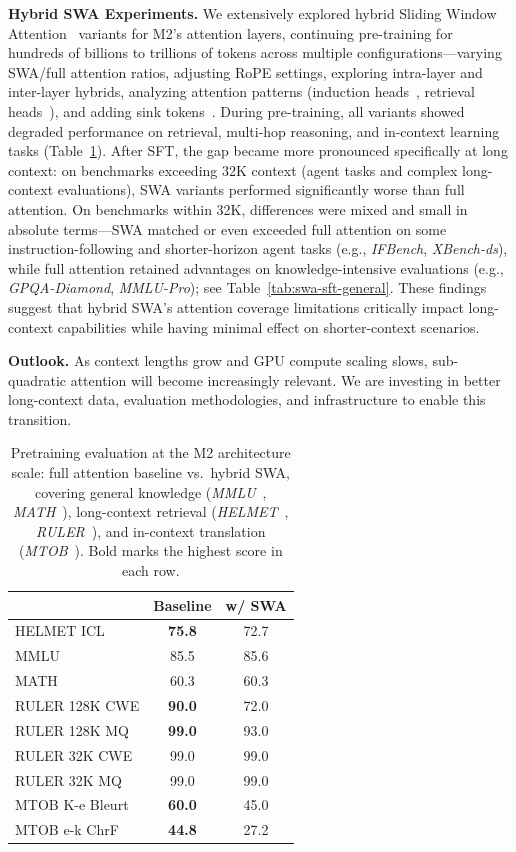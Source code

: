 \noindent \textbf{Hybrid SWA Experiments.} We extensively explored hybrid Sliding Window Attention~\citep{beltagy2020longformer} variants for M2's attention layers, continuing pre-training for hundreds of billions to trillions of tokens across multiple configurations---varying SWA/full attention ratios, adjusting RoPE settings, exploring intra-layer and inter-layer hybrids, analyzing attention patterns (induction heads~\citep{olsson2022induction}, retrieval heads~\citep{wu2024retrieval}), and adding sink tokens~\citep{xiao2024streamingllm}. During pre-training, all variants showed degraded performance on retrieval, multi-hop reasoning, and in-context learning tasks (Table~\ref{tab:swa-pretrain}). After SFT, the gap became more pronounced specifically at long context: on benchmarks exceeding 32K context (agent tasks and complex long-context evaluations), SWA variants performed significantly worse than full attention. On benchmarks within 32K, differences were mixed and small in absolute terms---SWA matched or even exceeded full attention on some instruction-following and shorter-horizon agent tasks (e.g., \emph{IFBench}, \emph{XBench-ds}), while full attention retained advantages on knowledge-intensive evaluations (e.g., \emph{GPQA-Diamond}, \emph{MMLU-Pro}); see Table~\ref{tab:swa-sft-general}. These findings suggest that hybrid SWA's attention coverage limitations critically impact long-context capabilities while having minimal effect on shorter-context scenarios.

\noindent \textbf{Outlook.} As context lengths grow and GPU compute scaling slows, sub-quadratic attention will become increasingly relevant. We are investing in better long-context data, evaluation methodologies, and infrastructure to enable this transition.

\begin{table}[h]
\centering
\caption{Pretraining evaluation at the M2 architecture scale: full attention baseline vs.\ hybrid SWA, covering general knowledge (\emph{MMLU}~\citep{hendrycks2021mmlu}, \emph{MATH}~\citep{hendrycks2021math}), long-context retrieval (\emph{HELMET}~\citep{yen2024helmet}, \emph{RULER}~\citep{hsieh2024ruler}), and in-context translation (\emph{MTOB}~\citep{tanzer2024mtob}). Bold marks the highest score in each row.}
\label{tab:swa-pretrain}
\begin{tabular}{lcc}
\toprule
& \textbf{Baseline} & \textbf{w/ SWA} \\
\midrule
HELMET ICL & \textbf{75.8} & 72.7 \\
MMLU & 85.5 & 85.6 \\
MATH & 60.3 & 60.3 \\
RULER 128K CWE & \textbf{90.0} & 72.0 \\
RULER 128K MQ & \textbf{99.0} & 93.0 \\
RULER 32K CWE & 99.0 & 99.0 \\
RULER 32K MQ & 99.0 & 99.0 \\
MTOB K-e Bleurt & \textbf{60.0} & 45.0 \\
MTOB e-k ChrF & \textbf{44.8} & 27.2 \\
\bottomrule
\end{tabular}
\end{table}

